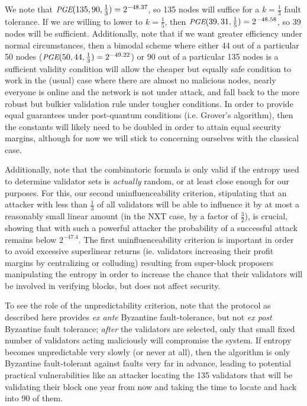 \documentclass[11pt,a4paper]{article}
\makeatletter
\theoremstyle{plain}
\theoremstyle{definition}
\theoremstyle{remark}
\newcommand{\ie}{i.e.\@\xspace}
\newcommand{\makeintoafunction}[1]{\textit{\uppercase{\small #1}}}
\newcommand{\PGE}{\makeintoafunction{pge}}
\makeatother
\begin{document}
We note that $\PGE(135, 90, \frac{1}{3}) = 2^{-48.37}$, so 135 nodes will suffice for a $k = \frac{1}{3}$ fault tolerance. If we are willing to lower to $k = \frac{1}{5}$, then $\PGE(39, 31, \frac{1}{5}) = 2^{-48.58}$, so 39 nodes will be sufficient. Additionally, note that if we want greater efficiency under normal circumstances, then a bimodal scheme where either 44 out of a particular 50 nodes ($\PGE(50, 44, \frac{1}{3}) = 2^{-49.22}$) or 90 out of a particular 135 nodes is a sufficient validity condition will allow the cheaper but equally safe condition to work in the (usual) case where there are almost no malicious nodes, nearly everyone is online and the network is not under attack, and fall back to the more robust but bulkier validation rule under tougher conditions. In order to provide equal guarantees under post-quantum conditions (\ie Grover's algorithm), then the constants will likely need to be doubled in order to attain equal security margins, although for now we will stick to concerning ourselves with the classical case.

Additionally, note that the combinatoric formula is only valid if the entropy used to determine validator sets is \emph{actually} random, or at least close enough for our purposes. For this, our second uninfluenceability criterion, stipulating that an attacker with less than $\frac{1}{3}$ of all validators will be able to influence it by at most a reasonably small linear amount (in the NXT case, by a factor of $\frac{3}{2}$), is crucial, showing that with such a powerful attacker the probability of a successful attack remains below $2^{-47.4}$. The first uninfluenceability criterion is important in order to avoid excessive superlinear returns (ie. validators increasing their profit margins by centralizing or colluding) resulting from super-block proposers manipulating the entropy in order to increase the chance that their validators will be involved in verifying blocks, but does not affect security.

To see the role of the unpredictability criterion, note that the protocol as described here provides \emph{ex ante} Byzantine fault-tolerance, but not \emph{ex post} Byzantine fault tolerance; \emph{after} the validators are selected, only that small fixed number of validators acting maliciously will compromise the system. If entropy becomes unpredictable very slowly (or never at all), then the algorithm is only Byzantine fault-tolerant against faults very far in advance, leading to potential practical vulnerabilities like an attacker locating the 135 validators that will be validating their block one year from now and taking the time to locate and hack into 90 of them.
\end{document}
